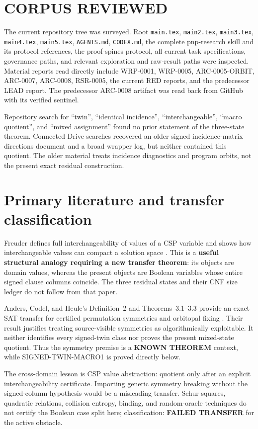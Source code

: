 \documentclass[11pt]{article}
\begin{document}
\section{CORPUS REVIEWED}
The current repository tree was surveyed.  Root \texttt{main.tex},
\texttt{main2.tex}, \texttt{main3.tex}, \texttt{main4.tex},
\texttt{main5.tex}, \texttt{AGENTS.md}, \texttt{CODEX.md}, the complete
pnp-research skill and its protocol references, the proof-spines protocol,
all current task specifications, governance paths, and relevant exploration
and raw-result paths were inspected.  Material reports read directly include
WRP-0001, WRP-0005, ARC-0005-ORBIT, ARC-0007, ARC-0008, RSR-0005, the
current RED reports, and the predecessor LEAD report.  The predecessor
ARC-0008 artifact was read back from GitHub with its verified sentinel.

Repository search for ``twin'', ``identical incidence'', ``interchangeable'',
``macro quotient'', and ``mixed assignment'' found no prior statement of the
three-state theorem.  Connected Drive searches recovered an older signed
incidence-matrix directions document and a broad wrapper log, but neither
contained this quotient.  The older material treats incidence diagnostics and
program orbits, not the present exact residual construction.

\section{Primary literature and transfer classification}
Freuder defines full interchangeability of values of a CSP variable and shows
how interchangeable values can compact a solution space
\cite{wrp0006Freuder}.  This is a \textbf{useful structural analogy requiring
a new transfer theorem}: its objects are domain values, whereas the present
objects are Boolean variables whose entire signed clause columns coincide.
The three residual states and their CNF size ledger do not follow from that
paper.

Anders, Codel, and Heule's Definition~2 and Theorems~3.1--3.3 provide an
exact SAT transfer for certified permutation symmetries and orbitopal fixing
\cite{arc0005Orbitopal}.  Their result justifies treating source-visible
symmetries as algorithmically exploitable.  It neither identifies every
signed-twin class nor proves the present mixed-state quotient.  Thus the
symmetry premise is a \textbf{KNOWN THEOREM} context, while
SIGNED-TWIN-MACRO1 is proved directly below.

The cross-domain lesson is CSP value abstraction: quotient only after an
explicit interchangeability certificate.  Importing generic symmetry
breaking without the signed-column hypothesis would be a misleading
transfer.  Schur squares, quadratic relations, collision entropy, binding,
and random-oracle techniques do not certify the Boolean case split here;
classification: \textbf{FAILED TRANSFER} for the active obstacle.
\end{document}
